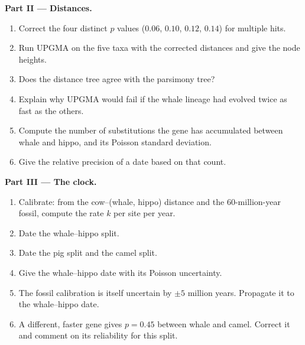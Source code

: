 \begin{problem}
\medskip
\noindent\textbf{Part II --- Distances.}
\begin{enumerate}[resume]
  \item Correct the four distinct $p$ values ($0.06$, $0.10$, $0.12$,
        $0.14$) for multiple hits.
  \item Run UPGMA on the five taxa with the corrected distances and
        give the node heights.
  \item Does the distance tree agree with the parsimony tree?
  \item Explain why UPGMA would fail if the whale lineage had
        evolved twice as fast as the others.
  \item Compute the number of substitutions the gene has
        accumulated between whale and hippo, and its Poisson
        standard deviation.
  \item Give the relative precision of a date based on that count.
\end{enumerate}

\medskip
\noindent\textbf{Part III --- The clock.}
\begin{enumerate}[resume]
  \item Calibrate: from the cow--(whale, hippo) distance and the
        60-million-year fossil, compute the rate $k$ per site per
        year.
  \item Date the whale--hippo split.
  \item Date the pig split and the camel split.
  \item Give the whale--hippo date with its Poisson uncertainty.
  \item The fossil calibration is itself uncertain by $\pm 5$
        million years. Propagate it to the whale--hippo date.
  \item A different, faster gene gives $p = 0.45$ between whale and
        camel. Correct it and comment on its reliability for this
        split.
\end{enumerate}


\end{problem}
